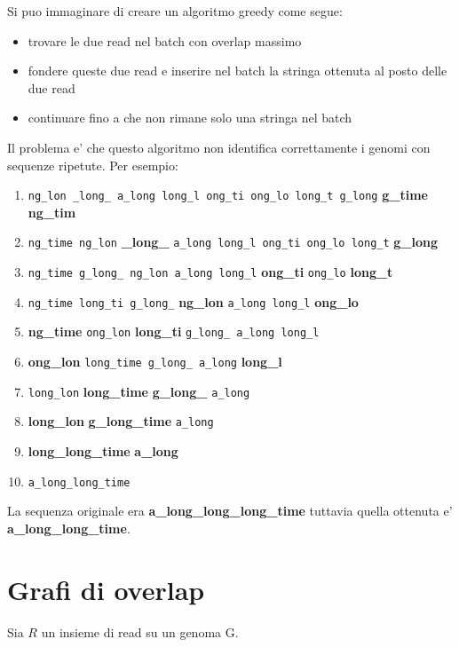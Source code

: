 Si puo immaginare di creare un algoritmo greedy come segue:

\begin{itemize}
\item trovare le due read nel batch con overlap massimo
\item fondere queste due read e inserire nel batch la stringa ottenuta al posto delle due read
\item continuare fino a che non rimane solo una stringa nel batch
\end{itemize}

Il problema e' che questo algoritmo non identifica correttamente i genomi con sequenze ripetute. Per esempio:

\begin{enumerate}
\item \texttt{ng\_lon \_long\_ a\_long long\_l ong\_ti ong\_lo long\_t g\_long} \textbf{g\_time} \textbf{ng\_tim}
\item \texttt{ng\_time ng\_lon} \textbf{\_long\_} \texttt{a\_long long\_l ong\_ti ong\_lo long\_t} \textbf{g\_long}
\item \texttt{ng\_time g\_long\_ ng\_lon a\_long long\_l} \textbf{ong\_ti} \texttt{ong\_lo} \textbf{long\_t}
\item \texttt{ng\_time long\_ti g\_long\_} \textbf{ng\_lon} \texttt{a\_long long\_l} \textbf{ong\_lo}
\item \textbf{ng\_time} \texttt{ong\_lon} \textbf{long\_ti} \texttt{g\_long\_ a\_long long\_l}
\item \textbf{ong\_lon} \texttt{long\_time g\_long\_ a\_long} \textbf{long\_l}
\item \texttt{long\_lon} \textbf{long\_time} \textbf{g\_long\_} \texttt{a\_long}
\item \textbf{long\_lon} \textbf{g\_long\_time} \texttt{a\_long}
\item \textbf{long\_long\_time} \textbf{a\_long}
\item \texttt{a\_long\_long\_time}
\end{enumerate}

La sequenza originale era \textbf{a\_long\_long\_long\_time} tuttavia quella ottenuta e' \textbf{a\_long\_long\_time}.

\section{Grafi di overlap}

Sia $R$ un insieme di read su un genoma G.

